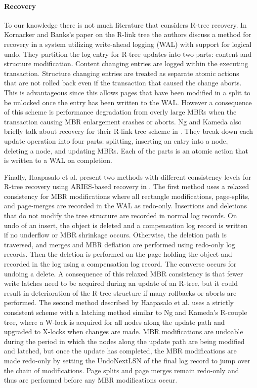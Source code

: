 \paragraph{Recovery} To our knowledge there is not much literature that considers
R-tree recovery. In Kornacker and Banks's paper on the R-link tree 
\cite{kornacker1995high} the authors discuss a method for recovery in a system 
utilizing write-ahead logging (WAL) with support for logical undo. They partition the 
log entry for R-tree updates into two parts: content and structure modification. 
Content changing entries are logged within the executing transaction. Structure 
changing entries are treated as separate atomic actions that are not rolled back 
even if the transaction that caused the change aborts. This is advantageous since
this allows pages that have been modified in a split to be unlocked once the entry
has been written to the WAL. However a consequence of this scheme is performance
degradation from overly large MBRs when the transaction causing MBR enlargement 
crashes or aborts. Ng and Kameda also briefly talk about recovery for their R-link
tree scheme in \cite{ng1994r}. They break down each update operation into four parts:
splitting, inserting an entry into a node, deleting a node, and updating MBRs. Each
of the parts is an atomic action that is written to a WAL on completion. 

Finally, Haapasalo et al. present two methods with different consistency levels 
for R-tree recovery using ARIES-based recovery \cite{mohan1992aries} in 
\cite{haapasalo2013recovery}. The first method uses a relaxed consistency 
for MBR modifications where all rectangle modifications, page-splits, and 
page-merges are recorded in the WAL as redo-only. 
Insertions and deletions that do not modify the tree structure are recorded in 
normal log records. On undo of an insert, the object is deleted and a compensation
log record is written if no underflow or MBR shrinkage occurs. Otherwise, the deletion
path is traversed, and merges and MBR deflation are performed using redo-only log 
records. Then the deletion is performed on the page holding the object and recorded
in the log using a compensation log record. The converse occurs for undoing a delete.
A consequence of this relaxed MBR consistency is that fewer write latches need to be
acquired during an update of an R-tree, but it could result in deterioration of the 
R-tree structure if many rollbacks or aborts are performed. The second method 
described by Haapasalo et al. uses a strictly consistent scheme with a latching 
method similar to Ng and Kameda's R-couple tree\cite{ng1993concurrent}, where 
a W-lock is acquired for all nodes along the update path and upgraded to X-locks 
when changes are made. MBR modifications are undoable during the period in 
which the nodes along the update path are being modified and latched, but once 
the update has completed, the MBR modifications are made redo-only by setting 
the UndoNextLSN of the final log record to jump over the chain of modifications. 
Page splits and page merges remain redo-only and thus are performed before 
any MBR modifications occur. 

